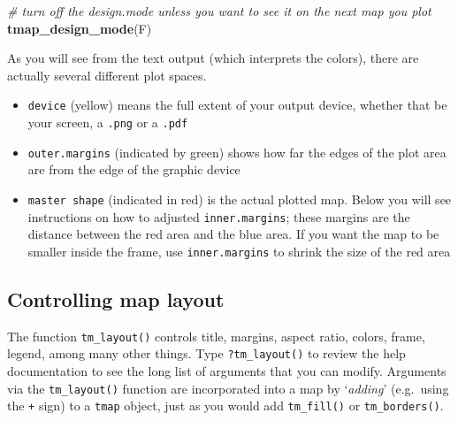 \documentclass[
]{book}
\newenvironment{Shaded}{\begin{snugshade}}{\end{snugshade}}
\newcommand{\CommentTok}[1]{\textcolor[rgb]{0.56,0.35,0.01}{\textit{#1}}}
\newcommand{\FunctionTok}[1]{\textcolor[rgb]{0.13,0.29,0.53}{\textbf{#1}}}
\newcommand{\NormalTok}[1]{#1}
\providecommand{\tightlist}{%
  \setlength{\itemsep}{0pt}\setlength{\parskip}{0pt}}
\begin{document}
\begin{Shaded}
\begin{Highlighting}[]
\CommentTok{\# turn off the design.mode unless you want to see it on the next map you plot}
\FunctionTok{tmap\_design\_mode}\NormalTok{(F)}
\end{Highlighting}
\end{Shaded}

As you will see from the text output (which interprets the colors), there are actually several different plot spaces.

\begin{itemize}
\tightlist
\item
  \texttt{device} (yellow) means the full extent of your output device, whether that be your screen, a \texttt{.png} or a \texttt{.pdf}
\item
  \texttt{outer.margins} (indicated by green) shows how far the edges of the plot area are from the edge of the graphic device
\item
  \texttt{master\ shape} (indicated in red) is the actual plotted map. Below you will see instructions on how to adjusted \texttt{inner.margins}; these margins are the distance between the red area and the blue area. If you want the map to be smaller inside the frame, use \texttt{inner.margins} to shrink the size of the red area
\end{itemize}

\hypertarget{controlling-map-layout}{%
\subsection{Controlling map layout}\label{controlling-map-layout}}

The function \texttt{tm\_layout()} controls title, margins, aspect ratio, colors, frame, legend, among many other things. Type \texttt{?tm\_layout()} to review the help documentation to see the long list of arguments that you can modify. Arguments via the \texttt{tm\_layout()} function are incorporated into a map by `\emph{adding}' (e.g.~using the \texttt{+} sign) to a \texttt{tmap} object, just as you would add \texttt{tm\_fill()} or \texttt{tm\_borders()}.
\end{document}
